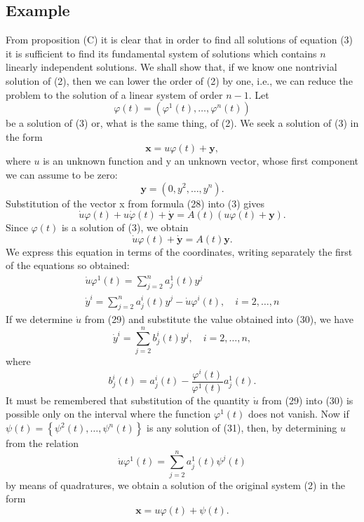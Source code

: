 \documentclass[10pt,a5paper]{book}
\theoremstyle{plain}
\theoremstyle{definition}
\theoremstyle{remark}
\begin{document}
\subsection*{Example}
From proposition (C) it is clear that in order to find all solutions of equation (3) it is sufficient to find its fundamental system of solutions which contains $n$ linearly independent solutions. We shall show that, if we know one nontrivial solution of (2), then we can lower the order of (2) by one, i.e., we can reduce the problem to the solution of a linear system of order $n-1$. Let
\[
\varphi(t)=\left(\varphi^{1}(t), \ldots, \varphi^{n}(t)\right)
\]
be a solution of (3) or, what is the same thing, of (2). We seek a solution of (3) in the form
\begin{equation*}
\mathbf{x}=u \varphi(t)+\mathbf{y}, \tag{28}
\end{equation*}
where $u$ is an unknown function and y an unknown vector, whose first component we can assume to be zero:
\[
\mathbf{y}=\left(0, y^{2}, \ldots, y^{n}\right) .
\]
Substitution of the vector x from formula (28) into (3) gives
\[
\dot{u} \varphi(t)+u \dot{\varphi}(t)+\dot{\mathbf{y}}=A(t)(u \varphi(t)+\mathbf{y}) .
\]
Since $\varphi(t)$ is a solution of (3), we obtain
\[
\dot{u} \varphi(t)+\dot{\mathbf{y}}=A(t) \mathbf{y} .
\]
We express this equation in terms of the coordinates, writing separately the first of the equations so obtained:
\begin{gather*}
\dot{u} \varphi^{1}(t)=\sum_{j=2}^{n} a_{j}^{1}(t) y^{j}  \tag{29}\\
\dot{y}^{i}=\sum_{j=2}^{n} a_{j}^{i}(t) y^{j}-\dot{u} \varphi^{i}(t), \quad i=2, \ldots, n \tag{30}
\end{gather*}
If we determine $\dot{u}$ from (29) and substitute the value obtained into (30), we have
\begin{equation*}
\dot{y}^{i}=\sum_{j=2}^{n} b_{j}^{i}(t) y^{j}, \quad i=2, \ldots, n, \tag{31}
\end{equation*}
where
\[
b_{j}^{i}(t)=a_{j}^{i}(t)-\frac{\varphi^{i}(t)}{\varphi^{1}(t)} a_{j}^{1}(t) .
\]
It must be remembered that substitution of the quantity $\dot{u}$ from (29) into (30) is possible only on the interval where the function $\varphi^{1}(t)$ does not vanish. Now if $\psi(t)=\left\{\psi^{2}(t), \ldots, \psi^{n}(t)\right\}$ is any solution of (31), then,
by determining $u$ from the relation
\[
\dot{u} \varphi^{1}(t)=\sum_{j=2}^{n} a_{j}^{1}(t) \psi^{j}(t)
\]
by means of quadratures, we obtain a solution of the original system (2) in the form
\[
\mathbf{x}=u \varphi(t)+\psi(t) .
\]
\end{document}
